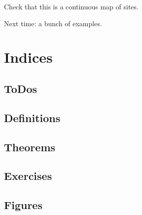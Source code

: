 \begin{exercise}[?]

Check that this is a continuous map of sites.

\end{exercise}

Next time: a bunch of examples.

\section{Indices}
\subsection{ToDos}


\newpage

\subsection{Definitions}

\renewcommand{\listtheoremname}{Definitions}
\listoftheorems[ignoreall,show={definition}, numwidth=3.5em]

\subsection{Theorems}

\renewcommand{\listtheoremname}{Theorems}
\listoftheorems[ignoreall,show={theorem,proposition}, numwidth=3.5em]

\subsection{Exercises}

\renewcommand{\listtheoremname}{Exercises}
\listoftheorems[ignoreall,show={exercise}, numwidth=3.5em]

\subsection{Figures}

\listoffigures


\printbibliography[title=Bibliography]



